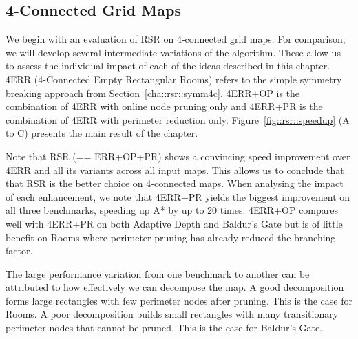 

\subsection{4-Connected Grid Maps}
We begin with an evaluation of RSR on 4-connected grid maps. 
For comparison, we will develop several intermediate variations
of the algorithm. These allow us to assess the individual impact
of each of the ideas described in this chapter.
4ERR (4-Connected Empty Rectangular Rooms) refers to the simple
symmetry breaking approach from Section~\ref{cha::rsr::symm4c}.
4ERR+OP is the combination of 4ERR with online node pruning only and 
4ERR+PR is the combination of 4ERR with perimeter reduction only.
Figure~\ref{fig::rsr::speedup} (A to C) presents the main result of the
chapter.
\par
Note that RSR (== ERR+OP+PR) shows a convincing 
speed improvement over 4ERR and all its variants across all input maps.
This allows us to conclude that that RSR is the better choice on 4-connected maps.
When analysing the impact of each enhancement, we note that 4ERR+PR yields the
biggest improvement on all three benchmarks, speeding up A* by up to 20 times.
4ERR+OP compares well with 4ERR+PR on both Adaptive Depth and
Baldur's Gate but is of little benefit on Rooms where perimeter pruning has
already reduced the branching factor.
\par
The large performance variation from one benchmark to another can be attributed
to how effectively we can decompose the map. A good decomposition forms large
rectangles with few perimeter nodes after pruning. This is the case for Rooms.
A poor decomposition builds small rectangles with many transitionary perimeter 
nodes that cannot be pruned. This is the case for Baldur's Gate. 


